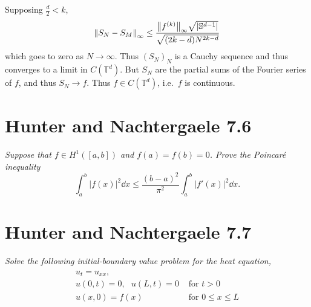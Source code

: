 \documentclass[12pt]{article}
\theoremstyle{plain}
\begin{document}
Supposing $\frac{d}{2} < k$,
\begin{align*}
    \norm{S_N - S_M}_\infty \leq \frac{\norm{f^{(k)}}_\infty\sqrt{|\mathbb{S}^{d-1}|}}{\sqrt{(2k-d)N^{2k-d}}}
\end{align*}
which goes to zero as $N \rightarrow \infty$.  Thus $(S_N)_N$ is a Cauchy sequence and thus converges to a limit in $C(\mathbb{T}^d)$.  But $S_N$ are the partial sums of the Fourier series of $f$, and thus $S_N \rightarrow f$.  Thus $f \in C(\mathbb{T}^d)$, i.e.~$f$ is continuous.

\section*{Hunter and Nachtergaele 7.6}
\emph{Suppose that $f \in H^1([a,b])$ and $f(a) = f(b) = 0$.  Prove the \emph{Poincar\'{e} inequality} $$\int_a^b|f(x)|^2 \dd x \leq \frac{(b-a)^2}{\pi^2}\int_a^b|f'(x)|^2 \dd x.$$}

\section*{Hunter and Nachtergaele 7.7}
\emph{Solve the following initial-boundary value problem for the heat equation,}
\begin{align*}
    \begin{array}{ll}
    u_t = u_{xx}, & \\
    u(0, t) = 0,\ \ \ u(L,t) = 0 & \text{ for } t > 0 \\
    u(x, 0) = f(x) & \text{ for } 0 \leq x \leq L
    \end{array}
\end{align*}
\end{document}
